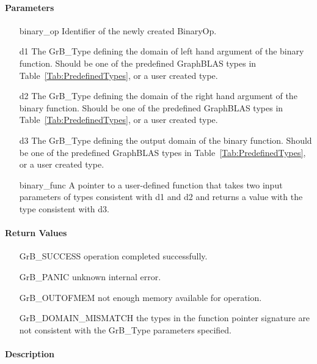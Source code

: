 \paragraph{Parameters}

\begin{itemize}[leftmargin=1.1in]
    \item[{\sf binary\_op}]      Identifier of the newly created BinaryOp.
    \item[{\sf d1}]      The {\sf GrB\_Type} defining the domain of left hand argument of
    the binary function. Should be one of the predefined
    GraphBLAS types in Table~\ref{Tab:PredefinedTypes}, or a user created type.
    \item[{\sf d2}]      The {\sf GrB\_Type} defining the domain of the right hand 
    argument of the binary function. Should be one of the predefined
    GraphBLAS types in Table~\ref{Tab:PredefinedTypes}, or a user created type.
    \item[{\sf d3}]       The {\sf GrB\_Type} defining the output domain of the binary
    function. Should be one of the predefined
    GraphBLAS types in Table~\ref{Tab:PredefinedTypes}, or a user created type.
    \item[{\sf binary\_func}]    A pointer to a user-defined function that takes two input 
    parameters of types consistent with {\sf d1} and {\sf d2} and returns a 
    value with the type consistent with {\sf d3}.
\end{itemize}


\paragraph{Return Values}

\begin{itemize}[leftmargin=2.1in]
\item[{\sf GrB\_SUCCESS}]           operation completed successfully.
\item[{\sf GrB\_PANIC}]             unknown internal error.
\item[{\sf GrB\_OUTOFMEM}]          not enough memory available for operation.
\item[{\sf GrB\_DOMAIN\_MISMATCH}]  the types in the function pointer signature are not   
                                    consistent with the {\sf GrB\_Type} parameters specified.
\end{itemize}

\paragraph{Description}

